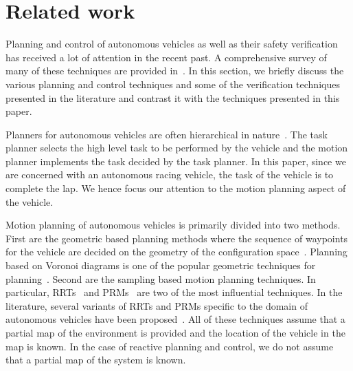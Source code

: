 \section{Related work}
\label{sec:relwork}

Planning and control of autonomous vehicles as well as their safety verification has received a lot of attention in the recent past. A comprehensive survey of many of these techniques are provided in~\cite{paden2016survey,machines5010006}. In this section, we briefly discuss the various planning and control techniques and some of the verification techniques presented in the literature and contrast it with the techniques presented in this paper.


Planners for autonomous vehicles are often hierarchical in nature~\cite{miller2008team,urmson2008autonomous}. The task planner selects the high level task to be performed by the vehicle and the motion planner implements the task decided by the task planner. In this paper, since we are concerned with an autonomous racing vehicle, the task of the vehicle is to complete the lap. We hence focus our attention to the motion planning aspect of the vehicle. 


Motion planning of autonomous vehicles is primarily divided into two methods. First are the geometric based planning methods where the sequence of waypoints for the vehicle are decided on the geometry of the configuration space~\cite{thrun2006stanley,montemerlo2008junior}. Planning based on Voronoi diagrams is one of the popular geometric techniques for planning~\cite{takahashi1989motion,shkolnik2009reachability}.
Second are the sampling based motion planning techniques.
In particular, RRTs~\cite{lavalle1998rapidly,karaman2011sampling} and PRMs~\cite{kavraki1996probabilistic} are two of the most influential techniques. In the literature, several variants of RRTs and PRMs specific to the domain of autonomous vehicles have been proposed~\cite{xu2012real,aoude2010threat,levinson2011towards,perez2012lqr,kant1986toward}. All of these techniques assume that a partial map of the environment is provided and the location of the vehicle in the map is known. In the case of reactive planning and control, we do not assume that a partial map of the system is known.

